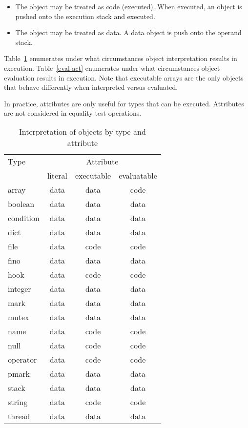 \begin{itemize}
\item{The object may be treated as code (executed).  When executed, an object is
pushed onto the execution stack and executed.}
\item{The object may be treated as data.  A data object is push onto the operand
stack.}
\end{itemize}

Table~\ref{interp-act} enumerates under what circumstances object interpretation
results in execution.  Table~\ref{eval-act} enumerates under what circumstances
object evaluation results in execution.  Note that executable arrays are the
only objects that behave differently when interpreted versus evaluated.

In practice, attributes are only useful for types that can be executed.
Attributes are not considered in equality test operations.

\begin{table}[htb]
\begin{center}
\begin{tabular}{|l|c|c|c|}
\hline
Type		& \multicolumn{3}{|c|}{Attribute}	\\
\cline{2-4}
		& literal & executable & evaluatable	\\
\hline \hline
array		& data	& data	& code	\\
\hline
boolean		& data	& data	& data	\\
\hline
condition	& data	& data	& data	\\
\hline
dict		& data	& data	& data	\\
\hline
file		& data	& code	& code	\\
\hline
fino		& data	& data	& data	\\
\hline
hook		& data	& code	& code	\\
\hline
integer		& data	& data	& data	\\
\hline
mark		& data	& data	& data	\\
\hline
mutex		& data	& data	& data	\\
\hline
name		& data	& code	& code	\\
\hline
null		& data	& code	& code	\\
\hline
operator	& data	& code	& code	\\
\hline
pmark		& data	& data	& data	\\
\hline
stack		& data	& data	& data	\\
\hline
string		& data	& code	& code	\\
\hline
thread		& data	& data	& data	\\
\hline
\end{tabular}
\end{center}
\caption{\label{interp-act}
Interpretation of objects by type and attribute}
\end{table}

